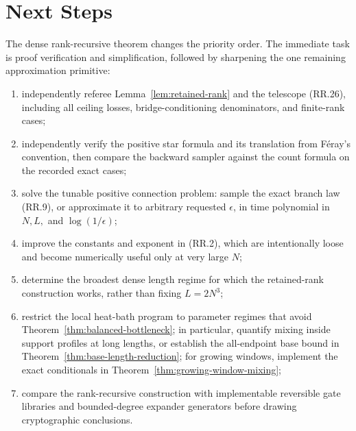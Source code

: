\section{Next Steps}

The dense rank-recursive theorem changes the priority order.  The immediate
task is proof verification and simplification, followed by sharpening the one
remaining approximation primitive:
\begin{enumerate}
\item independently referee Lemma~\ref{lem:retained-rank} and the telescope
  (RR.26), including all ceiling losses, bridge-conditioning denominators, and
  finite-rank cases;
\item independently verify the positive star formula and its translation from
  F\'eray's convention, then compare the backward sampler against the count
  formula on the recorded exact cases;
\item solve the tunable positive connection problem: sample the exact branch
  law (RR.9), or approximate it to arbitrary requested $\epsilon$, in time
  polynomial in $N,L,$ and $\log(1/\epsilon)$;
\item improve the constants and exponent in (RR.2), which are intentionally
  loose and become numerically useful only at very large $N$;
\item determine the broadest dense length regime for which the retained-rank
  construction works, rather than fixing $L=2N^3$;
\item restrict the local heat-bath program to parameter regimes that avoid
  Theorem~\ref{thm:balanced-bottleneck}; in particular, quantify mixing
  inside support profiles at long lengths, or establish the all-endpoint
  base bound in Theorem~\ref{thm:base-length-reduction}; for growing
  windows, implement the exact conditionals in
  Theorem~\ref{thm:growing-window-mixing};
\item compare the rank-recursive construction with implementable reversible
  gate libraries and bounded-degree expander generators before drawing
  cryptographic conclusions.
\end{enumerate}

